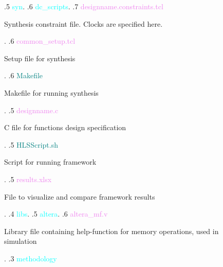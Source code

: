 \begin{figure}
\begin{minipage}{0.99\textwidth}
{    .5 \textcolor{cyan}{syn}.
    .6 \textcolor{cyan}{dc\_scripts}.
    .7 \textcolor{violet}{designname{.}constraints{.}tcl} \dotfill \:\:\begin{minipage}[t]{6cm}
                                                            Synthesis constraint file{.} Clocks are specified here{.}
                                                            \end{minipage}.
    .6 \textcolor{violet}{common\_setup{.}tcl} \dotfill \:\:\begin{minipage}[t]{6cm}
                                                            Setup file for synthesis 
                                                            \end{minipage}.
    .6 \textcolor{teal}{Makefile} \dotfill \:\:\begin{minipage}[t]{6cm}
                                                            Makefile for running synthesis
                                                            \end{minipage}.
    .5 \textcolor{violet}{designname{.}c} \dotfill \:\:\begin{minipage}[t]{6cm}
                                                            C file for functions design specification
                                                            \end{minipage}.
    .5 \textcolor{teal}{HLSScript{.}sh} \dotfill \:\:\begin{minipage}[t]{6cm}
                                                            Script for running framework
                                                            \end{minipage}. 
    .5 \textcolor{violet}{results{.}xlsx} \dotfill \:\:\begin{minipage}[t]{6cm}
                                                            File to visualize and compare framework results
                                                            \end{minipage}. 
    .4 \textcolor{cyan}{libs}.
    .5 \textcolor{cyan}{altera}.
    .6 \textcolor{violet}{altera\_mf{.}v} \dotfill \:\:\begin{minipage}[t]{6cm}
                                                            Library file containing help-function for memory operations, used in simulation
                                                            \end{minipage}. 
    .3 \textcolor{cyan}{methodology} \dotfill \:\:\begin{minipage}[t]{6cm}

\end{minipage}}
\end{minipage}
\end{figure}
